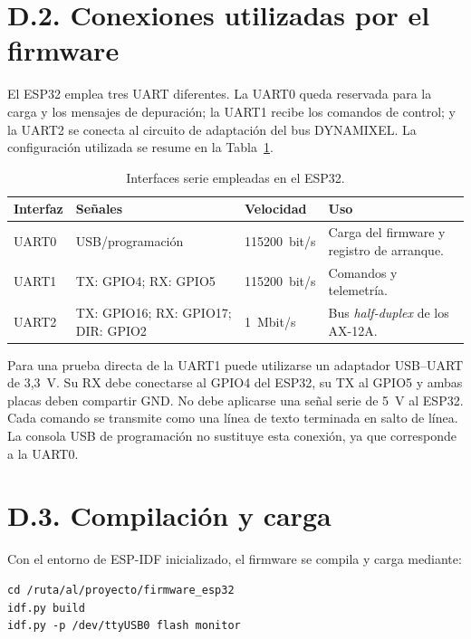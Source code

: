 \section*{D.2. Conexiones utilizadas por el firmware}

El ESP32 emplea tres UART diferentes. La UART0 queda reservada para la carga y
los mensajes de depuración; la UART1 recibe los comandos de control; y la UART2
se conecta al circuito de adaptación del bus DYNAMIXEL. La configuración
utilizada se resume en la Tabla~\ref{tab:manual_uart}.

\begin{table}[H]
    \centering
    \small
    \begin{tabularx}{\textwidth}{@{}lllX@{}}
        \toprule
        \textbf{Interfaz} & \textbf{Señales} & \textbf{Velocidad} & \textbf{Uso} \\
        \midrule
        UART0 & USB/programación & 115200~bit/s & Carga del firmware y registro de arranque. \\
        UART1 & TX: GPIO4; RX: GPIO5 & 115200~bit/s & Comandos y telemetría. \\
        UART2 & TX: GPIO16; RX: GPIO17; DIR: GPIO2 & 1~Mbit/s & Bus \textit{half-duplex} de los AX-12A. \\
        \bottomrule
    \end{tabularx}
    \caption{Interfaces serie empleadas en el ESP32.}
    \label{tab:manual_uart}
\end{table}

Para una prueba directa de la UART1 puede utilizarse un adaptador USB--UART de
3,3~V. Su RX debe conectarse al GPIO4 del ESP32, su TX al GPIO5 y ambas placas
deben compartir GND. No debe aplicarse una señal serie de 5~V al ESP32. Cada
comando se transmite como una línea de texto terminada en salto de línea. La
consola USB de programación no sustituye esta conexión, ya que corresponde a la
UART0.

\section*{D.3. Compilación y carga}

Con el entorno de ESP-IDF inicializado, el firmware se compila y carga mediante:

\begin{lstlisting}[basicstyle=\ttfamily\small,frame=single,breaklines=true]
cd /ruta/al/proyecto/firmware_esp32
idf.py build
idf.py -p /dev/ttyUSB0 flash monitor
\end{lstlisting}


